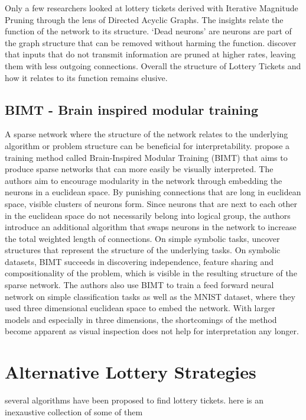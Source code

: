 Only a few researchers looked at lottery tickets derived with Iterative Magnitude Pruning through the lens of Directed Acyclic Graphs. 
The insights relate the function of the network to its structure.
`Dead neurons' \autocite{HanEtAl15, AllAlivePruning} are neurons are part of the graph structure that can be removed without harming the function. 
\textcite{DBLP:conf/iclr/FrankleC19} discover that inputs that do not transmit information are pruned at higher rates, leaving them with less outgoing connections.
Overall the structure of Lottery Tickets and how it relates to its function remains elusive.

\subsection{BIMT - Brain inspired modular training}
A sparse network where the structure of the network relates to the underlying algorithm or problem structure can be beneficial for interpretability.
\textcite{BIMT} propose a training method called Brain-Inspired Modular Training (BIMT) that aims to produce sparse networks that can more easily be visually interpreted.
The authors aim to encourage modularity in the network through embedding the neurons in a euclidean space.
By punishing connections that are long in euclidean space, visible clusters of neurons form. 
Since neurons that are next to each other in the euclidean space do not necessarily belong into logical group, the authors introduce an additional algorithm that swaps neurons in the network to increase the total weighted length of connections.
On simple symbolic tasks, \autocite{BIMT} uncover structures that represent the structure of the underlying tasks.
On symbolic datasets, BIMT succeeds in discovering independence, feature sharing and compositionality of the problem, which is visible in the resulting structure of the sparse network.
The authors also use BIMT to train a feed forward neural network on simple classification tasks as well as the MNIST dataset, where they used three dimensional euclidean space to embed the network.
With larger models and especially in three dimensions, the shortcomings of the method become apparent as visual inspection does not help for interpretation any longer.

\section{Alternative Lottery Strategies}
several algorithms have been proposed to find lottery tickets. here is an inexaustive collection of some of them 

